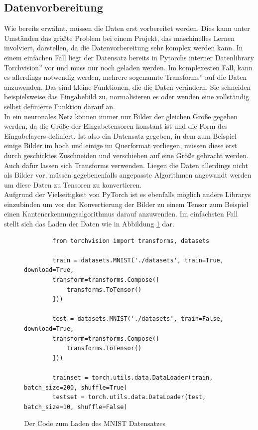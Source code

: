 \documentclass[11pt]{article}
\begin{document}
\subsection{Datenvorbereitung}
Wie bereits erwähnt, müssen die Daten erst vorbereitet werden. Dies kann unter Umständen das größte Problem bei einem Projekt, das maschinelles Lernen involviert, darstellen, da die Datenvorbereitung sehr komplex werden kann. In einem einfachen Fall liegt der Datensatz bereits in Pytorchs interner Datenlibrary \glqq Torchvision'' vor und muss nur noch geladen werden. Im komplexesten Fall, kann es allerdings notwendig werden, mehrere sogenannte \glqq Transforms'' auf die Daten anzuwenden. Das sind kleine Funktionen, die die Daten verändern. Sie schneiden beispielsweise das Eingabebild zu, normalisieren es oder wenden eine vollständig selbst definierte Funktion darauf an.\\
In ein neuronales Netz können immer nur Bilder der gleichen Größe gegeben werden, da die Größe der Eingabetensoren konstant ist und die Form des Eingabelayers definiert. Ist also ein Datensatz gegeben, in dem zum Beispiel  einige Bilder im hoch und einige im Querformat vorliegen, müssen diese erst durch geschicktes Zuschneiden und verschieben auf eine Größe gebracht werden. Auch dafür lassen sich Transforms verwenden. Liegen die Daten allerdings nicht als Bilder vor, müssen gegebenenfalls angepasste Algorithmen angewandt werden um diese Daten zu Tensoren zu konvertieren.\\
Aufgrund der Vielseitigkeit von PyTorch ist es ebenfalls möglich andere Librarys einzubinden um vor der Konvertierung der Bilder zu einem Tensor zum Beispiel einen Kantenerkennungsalgorithmus darauf anzuwenden. Im einfachsten Fall stellt sich das Laden der Daten wie in Abbildung \ref{MNIST_Dataloader_Code} dar.
\begin{figure}[h]
	\begin{verbatim}
		from torchvision import transforms, datasets
	
		train = datasets.MNIST('./datasets', train=True, download=True,
		transform=transforms.Compose([
			transforms.ToTensor()
		]))
		
		test = datasets.MNIST('./datasets', train=False, download=True,
		transform=transforms.Compose([
			transforms.ToTensor()
		]))
		
		trainset = torch.utils.data.DataLoader(train, batch_size=200, shuffle=True)
		testset = torch.utils.data.DataLoader(test, batch_size=10, shuffle=False)
	\end{verbatim}
	\caption{Der Code zum Laden des MNIST Datensatzes}
	\label{MNIST_Dataloader_Code}
\end{figure}
\end{document}
